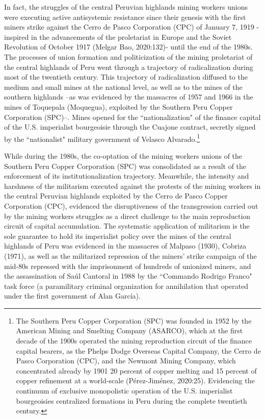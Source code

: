 \documentclass[]{interact}
\theoremstyle{plain}%
\theoremstyle{definition}
\theoremstyle{remark}
\begin{document}
In fact, the struggles of the central Peruvian highlands mining workers unions were executing active antisystemic resistance since their genesis with the first miners strike against the Cerro de Pasco Corporation (CPC) of January 7, 1919 -inspired in the advancements of the proletariat in Europe and the Soviet Revolution of October 1917 (Melgar Bao, 2020:132)- until the end of the 1980s.  The processes of union formation and politicization of the mining proletariat of the central highlands of Peru went through a trajectory of radicalization during most of the twentieth century. This trajectory of radicalization diffused to the medium and small mines at the national level, as well as to the mines of the southern highlands –as was evidenced by the massacres of 1957 and 1966 in the mines of Toquepala (Moquegua), exploited by the Southern Peru Copper Corporation (SPC)–. Mines opened for the “nationalization" of the finance capital of the U.S. imperialist bourgeoisie through the Cuajone contract, secretly signed by the “nationalist" military government of Velasco Alvarado.\footnote{The Southern Peru Copper Corporation (SPC) was founded in 1952 by the American Mining and Smelting Company (ASARCO), which at the first decade of the 1900s operated the mining reproduction circuit of the finance capital bearers, as the Phelps Dodge Overseas Capital Company, the Cerro de Pasco Corporation (CPC), and the Newmont Mining Company, which concentrated already by 1901 20 percent of copper melting and 15 percent of copper refinement at a world-scale (Pérez-Jiménez, 2020:25). Evidencing the continuum of exclusive monopolistic operation of the U.S. imperialist bourgeoisies centralized formations in Peru during the complete twentieth century.}

While during the 1980s, the co-optation of the mining workers unions of the Southern Peru Copper Corporation (SPC) was consolidated as a result of the enforcement of its institutionalization trajectory. Meanwhile, the intensity and harshness of the militarism executed against the protests of the mining workers in the central Peruvian highlands exploited by the Cerro de Pasco Copper Corporation (CPC), evidenced the disruptiveness of the transgression carried out by the mining workers struggles as a direct challenge to the main reproduction circuit of capital accumulation. The systematic application of militarism is the sole guarantee to hold its imperialist policy over the mines of the central highlands of Peru was evidenced in the massacres of Malpaso (1930), Cobriza (1971), as well as the militarized repression of the miners' strike campaign of the mid-80s repressed with the imprisonment of hundreds of unionized miners, and the assassination of Saúl Cantoral in 1988 by the “Commando Rodrigo Franco" task force (a paramilitary criminal organization for annihilation that operated under the first government of Alan García).
\end{document}

